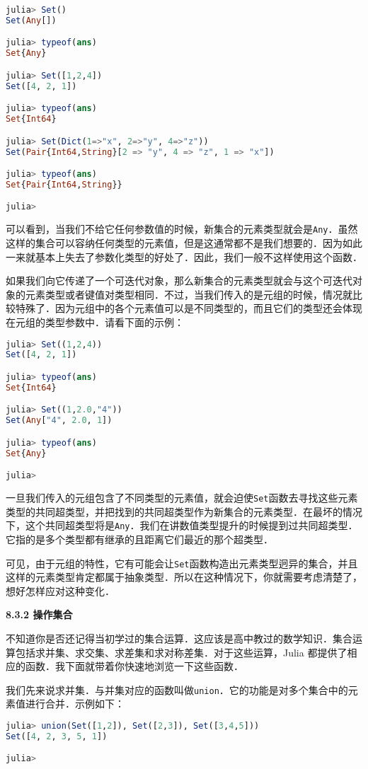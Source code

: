 \begin{lstlisting}[language=julia]
julia> Set()
Set(Any[])

julia> typeof(ans)
Set{Any}

julia> Set([1,2,4])
Set([4, 2, 1])

julia> typeof(ans)
Set{Int64}

julia> Set(Dict(1=>"x", 2=>"y", 4=>"z"))
Set(Pair{Int64,String}[2 => "y", 4 => "z", 1 => "x"])

julia> typeof(ans)
Set{Pair{Int64,String}}

julia> 
\end{lstlisting}

可以看到，当我们不给它任何参数值的时候，新集合的元素类型就会是\verb|Any|．虽然这样的集合可以容纳任何类型的元素值，但是这通常都不是我们想要的．因为如此一来就基本上失去了参数化类型的好处了．因此，我们一般不这样使用这个函数．

如果我们向它传递了一个可迭代对象，那么新集合的元素类型就会与这个可迭代对象的元素类型或者键值对类型相同．不过，当我们传入的是元组的时候，情况就比较特殊了．因为元组中的各个元素值可以是不同类型的，而且它们的类型还会体现在元组的类型参数中．请看下面的示例：

\begin{lstlisting}[language=julia]
julia> Set((1,2,4))
Set([4, 2, 1])

julia> typeof(ans)
Set{Int64}

julia> Set((1,2.0,"4"))
Set(Any["4", 2.0, 1])

julia> typeof(ans)
Set{Any}

julia> 
\end{lstlisting}

一旦我们传入的元组包含了不同类型的元素值，就会迫使\verb|Set|函数去寻找这些元素类型的共同超类型，并把找到的共同超类型作为新集合的元素类型．在最坏的情况下，这个共同超类型将是\verb|Any|．我们在讲数值类型提升的时候提到过共同超类型．它指的是多个类型都有继承的且距离它们最近的那个超类型．

可见，由于元组的特性，它有可能会让\verb|Set|函数构造出元素类型迥异的集合，并且这样的元素类型肯定都属于抽象类型．所以在这种情况下，你就需要考虑清楚了，想好怎样应对这种变化．

\textbf{8.3.2 操作集合}

不知道你是否还记得当初学过的集合运算．这应该是高中教过的数学知识．集合运算包括求并集、求交集、求差集和求对称差集．对于这些运算，Julia 都提供了相应的函数．我下面就带着你快速地浏览一下这些函数．

我们先来说求并集．与并集对应的函数叫做\verb|union|．它的功能是对多个集合中的元素值进行合并．示例如下：
\begin{lstlisting}[language=julia]
julia> union(Set([1,2]), Set([2,3]), Set([3,4,5]))
Set([4, 2, 3, 5, 1])

julia> 
\end{lstlisting}

